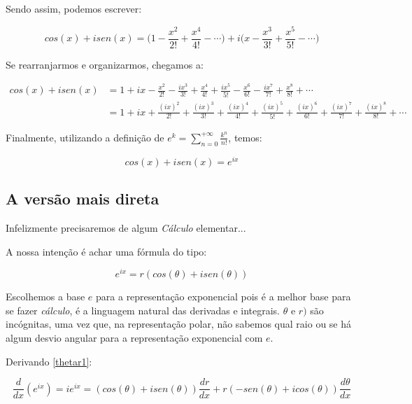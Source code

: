 \documentclass[a4paper]{article}
\begin{document}
Sendo assim, podemos escrever:

\begin{equation}
cos(x) + i sen(x) = \bigg(1 - \frac{x^2}{2!} + \frac{x^4}{4!} - \cdots\bigg) + i \bigg(x - \frac{x^3}{3!} + \frac{x^5}{5!} - \cdots\bigg)
\end{equation}

Se rearranjarmos e organizarmos, chegamos a:

\begin{align}
cos(x) + i sen(x) &= 1 + ix -\frac{x^2}{2!} - \frac{ix^3}{3!} + \frac{x^4}{4!} + \frac{ix^5}{5!} - \frac{x^6}{6!} - \frac{ix^7}{7!} + \frac{x^8}{8!} + \cdots \\
&= 1 + ix + \frac{(ix)^2}{2!} + \frac{(ix)^3}{3!} + \frac{(ix)^4}{4!} + \frac{(ix)^5}{5!} + \frac{(ix)^6}{6!} + \frac{(ix)^7}{7!} + \frac{(ix)^8}{8!} + \cdots
\end{align}

Finalmente, utilizando a definição de \(e^k = \sum_{n=0}^{+\infty} \frac{k^n}{n!}\), temos:

\begin{equation}
cos(x) + isen(x) = e^{ix}
\end{equation}

\subsection*{A versão mais direta}

Infelizmente precisaremos de algum \textit{Cálculo} elementar...

A nossa intenção é achar uma fórmula do tipo:

\begin{equation} \label{thetar1}
e^{ix} = r(cos(\theta) + isen(\theta))
\end{equation}

Escolhemos a base \(e\) para a representação exponencial pois é a melhor base para se fazer \textit{cálculo}, é a linguagem natural das derivadas e integrais. \(\theta\) e \(r)\) são incógnitas, uma vez que, na representação polar, não sabemos qual raio ou se há algum desvio angular para a representação exponencial com \(e\).

Derivando \ref{thetar1}:

\begin{equation}
\frac{d}{dx} (e^{ix}) = ie^{ix} = (cos(\theta) + isen(\theta)) \frac{dr}{dx} + r(-sen(\theta) + icos(\theta))\frac{d\theta}{dx}
\end{equation}
\end{document}
